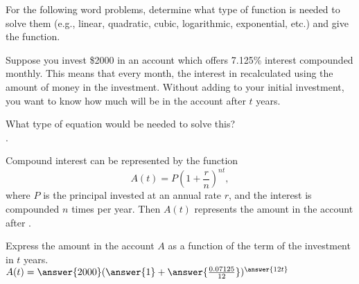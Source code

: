 \documentclass{ximera}
\author{Elizabeth Campolongo}
\begin{document}
\begin{exercise}
For the following word problems, determine what type of function is needed to solve them (e.g., linear, quadratic, cubic, logarithmic, exponential, etc.) and give the function. 
%

\item Suppose you invest \$2000 in an account which offers 7.125\% interest compounded monthly. This means that every month, the interest in recalculated using the amount of money in the investment. Without adding to your initial investment, you want to know how much will be in the account after $t$ years. 

What type of equation would be needed to solve this?\\
.
\begin{exercise}
Compound interest can be represented by the function
$$A(t) = P\left(1+\frac{r}{n}\right)^{nt},$$
where $P$ is the principal invested at an annual rate $r$, and the interest is compounded $n$ times per year. Then $A(t)$ represents the amount in the account after
%
.

\begin{exercise}
Express the amount in the account $A$ as a function of the term of the investment in $t$ years.\\
$A(t) = \answer{2000}(\answer{1}+ \answer{\frac{0.07125}{12}})^{\answer{12t}}$
\end{exercise}
\end{exercise}



\end{exercise}
\end{document}
